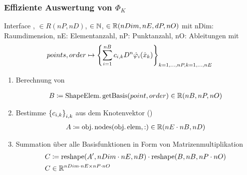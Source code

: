 \subsubsection{Effiziente Auswertung von $\Phi_K$}
Interface , $\in R(nP, nD)$, $\in \mathbb{N}$, $\in \mathbb{R}(nDim, nE, dP, nO)$
mit nDim: Raumdimension, nE: Elementanzahl, nP: Punktanzahl, nO: Ableitungen mit
\begin{align*}
  points, order \mapsto \left\{ \sum_{ i = 1}^{nB} c_{i, k}D^n \hat{\varphi}_i(\hat x_{k}) \right\}_{k= 1, \dots, nP, k = 1, \dots, nE}
\end{align*}
\begin{enumerate}
\item Berechnung von 
  \begin{align*}
  \end{align*}
\begin{align*}
  B \coloneqq \operatorname{ShapeElem.getBasis}(point, order) \in \mathbb{R}(nB,nP, nO)
\end{align*}
\item Bestimme $\left\{ c_{i, k} \right\}_{i, k}$ aus dem Knotenvektor ()
  \begin{align*}
    A \coloneqq \operatorname{obj.nodes}(\operatorname{obj.elem}, :) \in \mathbb{R}(nE \cdot nB, nD)
  \end{align*}
\item Summation über alle Basisfunktionen in Form von Matrizenmultiplikation 
  \begin{align*}
&C \coloneqq    \operatorname{reshape}(A', nDim \cdot nE, nB) \cdot \operatorname{reshape}(B, nB, nP \cdot nO)\\
&C \in \mathbb{R}^{nDim \cdot nE \times nP \cdot nO}
  \end{align*}
\end{enumerate}
